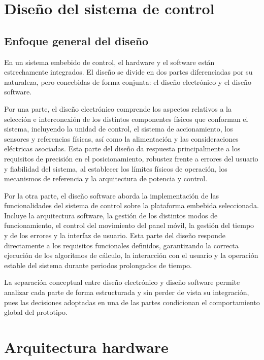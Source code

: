 \section{Diseño del sistema de control}

\subsection{Enfoque general del diseño}

En un sistema embebido de control, el hardware y el software están estrechamente integrados. El diseño se divide en dos partes diferenciadas por su naturaleza, pero concebidas de forma conjunta: el diseño electrónico y el diseño software.

Por una parte, el diseño electrónico comprende los aspectos relativos a la selección e interconexión de los distintos componentes físicos que conforman el sistema, incluyendo la unidad de control, el sistema de accionamiento, los sensores y referencias físicas, así como la alimentación y las consideraciones eléctricas asociadas. Esta parte del diseño da respuesta principalmente a los requisitos de precisión en el posicionamiento, robustez frente a errores del usuario y fiabilidad del sistema, al establecer los límites físicos de operación, los mecanismos de referencia y la arquitectura de potencia y control.

Por la otra parte, el diseño software aborda la implementación de las funcionalidades del sistema de control sobre la plataforma embebida seleccionada. Incluye la arquitectura software, la gestión de los distintos modos de funcionamiento, el control del movimiento del panel móvil, la gestión del tiempo y de los errores y la interfaz de usuario. Esta parte del diseño responde directamente a los requisitos funcionales definidos, garantizando la correcta ejecución de los algoritmos de cálculo, la interacción con el usuario y la operación estable del sistema durante periodos prolongados de tiempo.

La separación conceptual entre diseño electrónico y diseño software permite analizar cada parte de forma estructurada y sin perder de vista su integración, pues las decisiones adoptadas en una de las partes condicionan el comportamiento global del prototipo.



\section{Arquitectura hardware}


